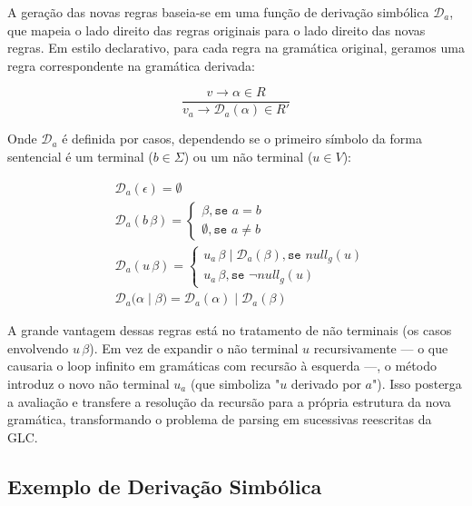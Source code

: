 A geração das novas regras baseia-se em uma função de derivação simbólica $\mathcal{D}_a$, que mapeia o lado direito das regras originais para o lado direito das novas regras. Em estilo declarativo, para cada regra na gramática original, geramos uma regra correspondente na gramática derivada:

\[
\frac{v \to \alpha \in R}{v_a \to \mathcal{D}_a(\alpha) \in R'}
\]

Onde $\mathcal{D}_a$ é definida por casos, dependendo se o primeiro símbolo da forma sentencial é um terminal ($b \in \Sigma$) ou um não terminal ($u \in V$):

\begin{align*}
    & \mathcal{D}_a(\epsilon) = \emptyset \\
    & \mathcal{D}_a(b \, \beta) = \left\{ \begin{array}{ll}
                                   \beta, \texttt{se } a = b \\
                                   \emptyset, \texttt{se } a \neq b
                                   \end{array} \right. \\
    & \mathcal{D}_a(u \, \beta) = \left\{ \begin{array}{ll}
                                   u_a \, \beta \;|\; \mathcal{D}_a(\beta),  \texttt{se } null_g(u) \\
                                   u_a \, \beta, \texttt{se } \neg null_g(u)
                                   \end{array} \right. \\
    & \mathcal{D}_a(\alpha \;|\; \beta) = \mathcal{D}_a(\alpha) \;|\; \mathcal{D}_a(\beta)
\end{align*} 

A grande vantagem dessas regras está no tratamento de não terminais (os casos envolvendo $u \, \beta$). Em vez de expandir o não terminal $u$ recursivamente — o que causaria o loop infinito em gramáticas com recursão à esquerda —, o método introduz o novo não terminal $u_a$ (que simboliza "$u$ derivado por $a$"). Isso posterga a avaliação e transfere a resolução da recursão para a própria estrutura da nova gramática, transformando o problema de parsing em sucessivas reescritas da GLC.

\subsection*{Exemplo de Derivação Simbólica}


